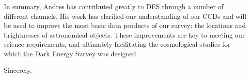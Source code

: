 \documentclass[12pt]{letter}
\begin{document}
\begin{letter}{}
In summary, Andres has contributed greatly to DES through a number of different
channels.  His work has clarified our understanding of our CCDs and will be
used to improve the most basic data products of our survey:  the locations and
brightnesses of astronomical objects.  These improvements are key to
meeting our science requirements, and ultimately facilitating the cosmological
studies for which the Dark Energy Survey was designed.

\closing{Sincerely, }






\end{letter}
\end{document}
